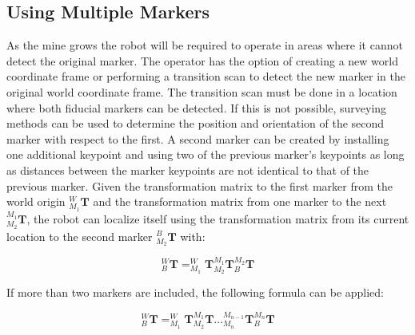 \subsection{Using Multiple Markers}

As the mine grows the robot will be required to operate in areas where it cannot detect the original marker. The operator has the option of creating a new world coordinate frame or performing a transition scan to detect the new marker in the original world coordinate frame. The transition scan must be done in a location where both fiducial markers can be detected. If this is not possible, surveying methods can be used to determine the position and orientation of the second marker with respect to the first. A second marker can be created by installing one additional keypoint and using two of the previous marker's keypoints as long as distances between the marker keypoints are not identical to that of the previous marker. Given the transformation matrix to the first marker from the world origin $^{W}_{M_1}\mathbf{T}$ and the transformation matrix from one marker to the next $^{M_1}_{M_2}\mathbf{T}$, the robot can localize itself using the transformation matrix from its current location to the second marker $^{B}_{M_2}\mathbf{T}$ with:

\begin{equation}
\label{eq:mtmat}
    ^{W}_{B}\mathbf{T} = ^{W}_{M_1}\mathbf{T}^{M_1}_{M_2}\mathbf{T}^{M_2}_{B}\mathbf{T}
\end{equation}

If more than two markers are included, the following formula can be applied:

\begin{equation}
\label{eq:mmtmat}
   ^{W}_{B}\mathbf{T} = ^{W}_{M_1}\mathbf{T}^{M_1}_{M_2}\mathbf{T}\hdots^{M_{n-1}}_{M_n}\mathbf{T}^{M_n}_{B}\mathbf{T}
\end{equation}
